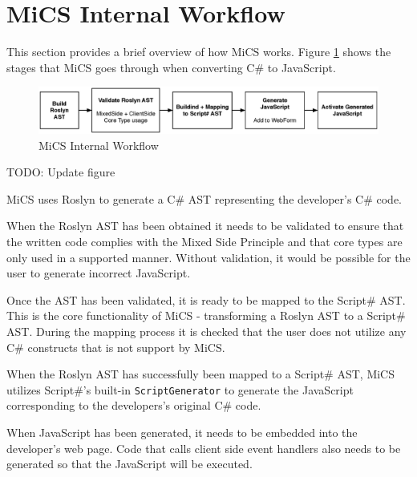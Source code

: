 \section{MiCS Internal Workflow} %
\label{sec:workflow_overview}

This section provides a brief overview of how MiCS works. Figure \ref{fig:mics_internal_workflow} shows the stages that MiCS goes through when converting C\# to JavaScript.

\begin{figure}[H]
	\begin{center}
		\centerline{\includegraphics[width=18cm]{resources/images/internalworkflow.eps}}
	\end{center}
	\caption{MiCS Internal Workflow}
	\label{fig:mics_internal_workflow}
\end{figure}

TODO: Update figure

MiCS uses Roslyn to generate a C\# AST representing the developer's  C\# code. 

When the Roslyn AST has been obtained it needs to be validated to ensure that the written code complies with the Mixed Side Principle and that core types are only used in a supported manner. Without validation, it would be possible for the user to generate incorrect JavaScript.

Once the AST has been validated, it is ready to be mapped to the Script\# AST. This is the core functionality of MiCS - transforming a Roslyn AST to a Script\# AST. During the mapping process it is checked that the user does not utilize any C\# constructs that is not support by MiCS. 

When the Roslyn AST has successfully been mapped to a Script\# AST, MiCS utilizes Script\#’s built-in \texttt{ScriptGenerator} to generate the JavaScript corresponding to the developers’s original C\# code. 

When JavaScript has been generated, it needs to be embedded into the developer’s web page. Code that calls client side event handlers also needs to be generated so that the JavaScript will be executed.


